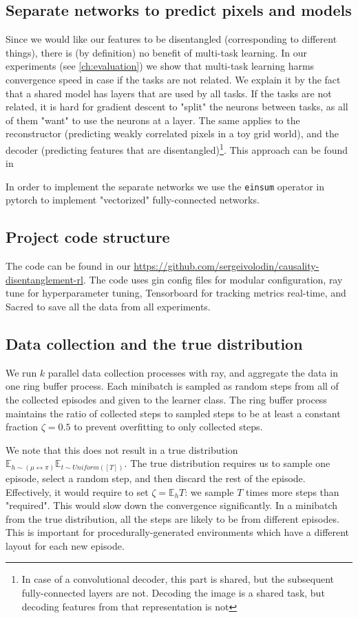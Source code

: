 \documentclass[a4paper,11pt,oneside]{report}
\begin{document}
\subsection{Separate networks to predict pixels and models}
Since we would like our features to be disentangled (corresponding to different things), there is (by definition) no benefit of multi-task learning. In our experiments (see \autoref{ch:evaluation}) we show that multi-task learning harms convergence speed in case if the tasks are not related. We explain it by the fact that a shared model has layers that are used by all tasks. If the tasks are not related, it is hard for gradient descent to "split" the neurons between tasks, as all of them "want" to use the neurons at a layer. The same applies to the reconstructor (predicting weakly correlated pixels in a toy grid world), and the decoder (predicting features that are disentangled)\footnote{In case of a convolutional decoder, this part is shared, but the subsequent fully-connected layers are not. Decoding the image is a shared task, but decoding features from that representation is not}. This approach can be found in \cite{Ke2019}

In order to implement the separate networks we use the {\tt einsum} operator in pytorch to implement "vectorized" fully-connected networks.

\subsection{Project code structure}
The code can be found in our \href{Github repository}{https://github.com/sergeivolodin/causality-disentanglement-rl}. The code uses gin config files for modular configuration, ray tune for hyperparameter tuning, Tensorboard for tracking metrics real-time, and Sacred to save all the data from all experiments.

\subsection{Data collection and the true distribution}
We run $k$ parallel data collection processes with ray, and aggregate the data in one ring buffer process. Each minibatch is sampled as random steps from all of the collected episodes and given to the learner class. The ring buffer process maintains the ratio of collected steps to sampled steps to be at least a constant fraction $\zeta=0.5$ to prevent overfitting to only collected steps.

We note that this does not result in a true distribution $\mathbb E_{h\sim (\mu\leftrightarrow\pi)}\mathbb E_{t\sim Uniform([T])}$. The true distribution requires us to sample one episode, select a random step, and then discard the rest of the episode. Effectively, it would require to set $\zeta=\mathbb E_{h}T$: we sample $T$ times more steps than "required". This would slow down the convergence significantly. In a minibatch from the true distribution, all the steps are likely to be from different episodes. This is important for procedurally-generated environments which have a different layout for each new episode.
\end{document}
